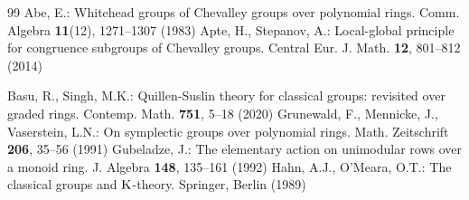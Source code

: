 \documentclass[11pt]{amsart}
\theoremstyle{definition}
\numberwithin{equation}{section}
\numberwithin{equation}{section}
\newcommand{\<}{\langle}
\renewcommand{\>}{\rangle}
\newcommand{\K}{{\operatorname{\rm K}}}
\begin{document}
\begin{thebibliography}{99}
Abe, E.: Whitehead groups of Chevalley groups over
polynomial rings. Comm. Algebra {\bf 11}(12), 1271--1307 (1983)
Apte, H., Stepanov, A.: Local-global principle for congruence subgroups of Chevalley groups. Central Eur. J. Math. {\bf 12}, 801--812 (2014)


Basu, R., Singh, M.K.: Quillen-Suslin theory for classical groups: revisited over graded rings. Contemp. Math. {\bf 751}, 5--18 (2020)
Grunewald, F., Mennicke, J., Vaserstein, L.N.: On symplectic groups over polynomial rings. Math. Zeitschrift {\bf 206}, 35--56 (1991)
Gubeladze, J.: The elementary action on unimodular rows over a monoid ring. J. Algebra {\bf 148}, 135--161 (1992)
Hahn, A.J., O'Meara, O.T.: The classical groups and $\K$-theory. Springer, Berlin (1989)


\end{thebibliography}
\end{document}
